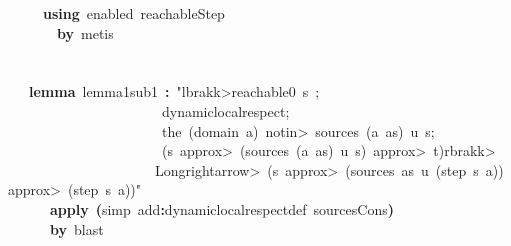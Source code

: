 \documentclass{article}
\newcommand{\syntaxKEYWORDA}[1]{\textcolor[rgb]{0.0,0.4,0.6}{\textbf{#1}}}
\newcommand{\syntaxLITERALA}[1]{\textcolor[rgb]{1.0,0.0,0.8}{#1}}
\newcommand{\syntaxOPERATOR}[1]{\textcolor[rgb]{0.0,0.0,0.0}{\textbf{#1}}}
\newcommand{\syntaxKEYWORDA}[1]{\textcolor[rgb]{0.0,0.4,0.6}{\textbf{#1}}}
\newcommand{\syntaxLITERALA}[1]{\textcolor[rgb]{1.0,0.0,0.8}{#1}}
\newcommand{\syntaxOPERATOR}[1]{\textcolor[rgb]{0.0,0.0,0.0}{\textbf{#1}}}
\newcommand{\syntaxKEYWORDA}[1]{\textcolor[rgb]{0.0,0.4,0.6}{\textbf{#1}}}
\newcommand{\syntaxLITERALA}[1]{\textcolor[rgb]{1.0,0.0,0.8}{#1}}
\newcommand{\syntaxOPERATOR}[1]{\textcolor[rgb]{0.0,0.0,0.0}{\textbf{#1}}}
\newcommand{\syntaxKEYWORDA}[1]{\textcolor[rgb]{0.0,0.4,0.6}{#1}}
\newcommand{\syntaxLITERALA}[1]{\textcolor[rgb]{1.0,0.0,0.8}{\textbf{#1}}}
\newcommand{\syntaxOPERATOR}[1]{\textcolor[rgb]{0.0,0.0,0.0}{#1}}
\newcommand{\syntaxKEYWORDA}[1]{\textcolor[rgb]{0.0,0.4,0.6}{\textbf{#1}}}
\newcommand{\syntaxLITERALA}[1]{\textcolor[rgb]{1.0,0.0,0.8}{#1}}
\newcommand{\syntaxOPERATOR}[1]{\textcolor[rgb]{0.0,0.0,0.0}{\textbf{#1}}}
\newcommand{\syntaxKEYWORDA}[1]{\textcolor[rgb]{0.0,0.4,0.6}{\textbf{#1}}}
\newcommand{\syntaxLITERALA}[1]{\textcolor[rgb]{1.0,0.0,0.8}{#1}}
\newcommand{\syntaxOPERATOR}[1]{\textcolor[rgb]{0.0,0.0,0.0}{\textbf{#1}}}
\begin{document}
{\ }{\ }{\ }{\ }{\ }{\ }\syntaxKEYWORDA{using}{\ }enabled{\ }reachableStep{\ }{\ }\hspace*{\fill}\\
{\ }{\ }{\ }{\ }{\ }{\ }{\ }{\ }\syntaxKEYWORDA{by}{\ }metis\hspace*{\fill}\\
{\ }{\ }{\ }{\ }{\ }\hspace*{\fill}\\
\hspace*{\fill}\\
{\ }{\ }{\ }{\ }\syntaxKEYWORDA{lemma}{\ }lemma\usebox{\underscorebox}1\usebox{\underscorebox}sub\usebox{\underscorebox}1{\ }\syntaxOPERATOR{:}{\ }\syntaxLITERALA{"\<lbrakk>reachable0{\ }s{\ };}\hspace*{\fill}\\
\syntaxLITERALA{{\ }{\ }{\ }{\ }{\ }{\ }{\ }{\ }{\ }{\ }{\ }{\ }{\ }{\ }{\ }{\ }{\ }{\ }{\ }{\ }{\ }{\ }{\ }dynamic\usebox{\underscorebox}local\usebox{\underscorebox}respect;}\hspace*{\fill}\\
\syntaxLITERALA{{\ }{\ }{\ }{\ }{\ }{\ }{\ }{\ }{\ }{\ }{\ }{\ }{\ }{\ }{\ }{\ }{\ }{\ }{\ }{\ }{\ }{\ }{\ }the{\ }(domain{\ }a){\ }\<notin>{\ }sources{\ }(a{\ }\usebox{\hashbox}{\ }as){\ }u{\ }s;}\hspace*{\fill}\\
\syntaxLITERALA{{\ }{\ }{\ }{\ }{\ }{\ }{\ }{\ }{\ }{\ }{\ }{\ }{\ }{\ }{\ }{\ }{\ }{\ }{\ }{\ }{\ }{\ }{\ }(s{\ }\<approx>{\ }(sources{\ }(a{\ }\usebox{\hashbox}{\ }as){\ }u{\ }s){\ }\<approx>{\ }t)\<rbrakk>}\hspace*{\fill}\\
\syntaxLITERALA{{\ }{\ }{\ }{\ }{\ }{\ }{\ }{\ }{\ }{\ }{\ }{\ }{\ }{\ }{\ }{\ }{\ }{\ }{\ }{\ }{\ }{\ }\<Longrightarrow>{\ }(s{\ }\<approx>{\ }(sources{\ }as{\ }u{\ }(step{\ }s{\ }a)){\ }\<approx>{\ }(step{\ }s{\ }a))"}\hspace*{\fill}\\
{\ }{\ }{\ }{\ }{\ }{\ }{\ }\syntaxKEYWORDA{apply}{\ }\syntaxOPERATOR{(}simp{\ }add\syntaxOPERATOR{:}dynamic\usebox{\underscorebox}local\usebox{\underscorebox}respect\usebox{\underscorebox}def{\ }sources\usebox{\underscorebox}Cons\syntaxOPERATOR{)}\hspace*{\fill}\\
{\ }{\ }{\ }{\ }{\ }{\ }{\ }\syntaxKEYWORDA{by}{\ }blast\hspace*{\fill}\\
\hspace*{\fill}\\
\end{document}
